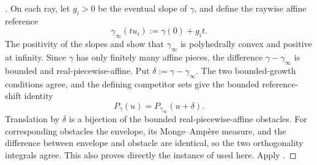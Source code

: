 \begin{proof}[]
On each ray, let $g_i>0$ be the eventual slope of $\gamma$, and define
the raywise affine reference
\[
                    \gamma_\infty(tu_i):=\gamma(0)+g_i t.
\]
The positivity of the slopes and
 show that
$\gamma_\infty$ is polyhedrally convex and positive at infinity.  Since
$\gamma$ has only finitely many affine pieces, the difference
$\gamma-\gamma_\infty$ is bounded and real-piecewise-affine.  Put
$\delta:=\gamma-\gamma_\infty$.  The two bounded-growth conditions agree,
and the defining competitor sets give the bounded reference-shift identity
\[
                  P_\gamma(u)=P_{\gamma_\infty}(u+\delta).
\]
Translation by $\delta$ is a bijection of the bounded real-piecewise-affine
obstacles.  For corresponding obstacles the envelope, its
Monge--Amp\`ere measure, and the difference between envelope and obstacle
are identical, so the two orthogonality integrals agree.  This also proves
directly the instance of
 used here.  Apply
.
\end{proof}
